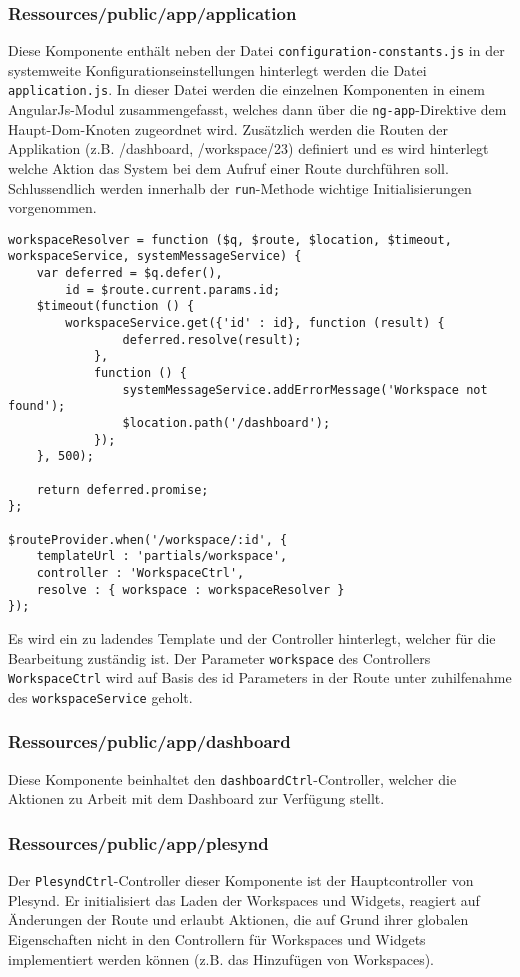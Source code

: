 \subsubsection*{Ressources/public/app/application}\label{section:app_application}
Diese Komponente enthält neben der Datei \texttt{configuration-constants.js} in der systemweite Konfigurationseinstellungen hinterlegt werden die Datei \texttt{application.js}. In dieser Datei werden die einzelnen Komponenten in einem AngularJs-Modul zusammengefasst, welches dann über die \texttt{ng-app}-Direktive dem Haupt-Dom-Knoten zugeordnet wird. Zusätzlich werden die Routen der Applikation (z.B. /dashboard, /workspace/23) definiert und es wird hinterlegt welche Aktion das System bei dem Aufruf einer Route durchführen soll. Schlussendlich werden innerhalb der \texttt{run}-Methode wichtige Initialisierungen vorgenommen.
\begin{lstlisting}[caption=Beispiel für die Definition einer Route und eines Resolvers]
workspaceResolver = function ($q, $route, $location, $timeout, workspaceService, systemMessageService) {
    var deferred = $q.defer(),
        id = $route.current.params.id;
    $timeout(function () {
        workspaceService.get({'id' : id}, function (result) {
                deferred.resolve(result);
            },
            function () {
                systemMessageService.addErrorMessage('Workspace not found');
                $location.path('/dashboard');
            });
    }, 500);

    return deferred.promise;
};

$routeProvider.when('/workspace/:id', {
    templateUrl : 'partials/workspace',
    controller : 'WorkspaceCtrl',
    resolve : { workspace : workspaceResolver }
});
\end{lstlisting}

Es wird ein zu ladendes Template und der Controller hinterlegt, welcher für die Bearbeitung zuständig ist. Der Parameter \texttt{workspace} des Controllers \texttt{WorkspaceCtrl} wird auf Basis des id Parameters in der Route unter zuhilfenahme des \texttt{workspaceService} geholt. 
\subsubsection*{Ressources/public/app/dashboard}
Diese Komponente beinhaltet den \texttt{dashboardCtrl}-Controller, welcher die Aktionen zu Arbeit mit dem Dashboard zur Verfügung stellt.

\subsubsection*{Ressources/public/app/plesynd}
Der \texttt{PlesyndCtrl}-Controller dieser Komponente ist der Hauptcontroller von Plesynd. Er initialisiert das Laden der Workspaces und Widgets, reagiert auf Änderungen der Route und erlaubt Aktionen, die auf Grund ihrer globalen Eigenschaften nicht in den Controllern für Workspaces und Widgets implementiert werden können (z.B. das Hinzufügen von Workspaces).

